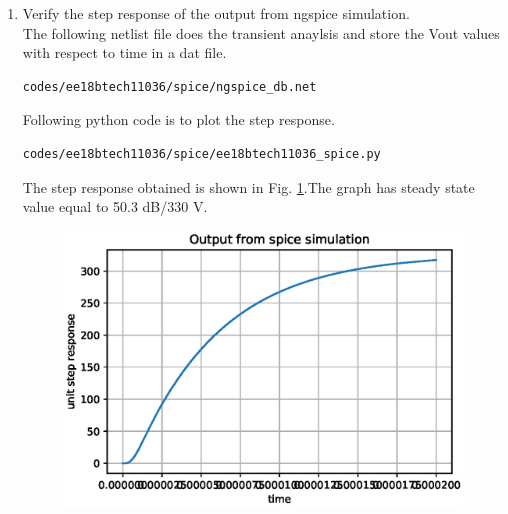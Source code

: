 \begin{enumerate}[label=\arabic*.,ref=\theenumi]
\item Verify the step response of the output from ngspice simulation.\\
\solution The following netlist file does the transient anaylsis and store the Vout values with respect to time in a dat file. 
\begin{lstlisting}
codes/ee18btech11036/spice/ngspice_db.net
\end{lstlisting}
Following python code is to plot the step response.
\begin{lstlisting}
codes/ee18btech11036/spice/ee18btech11036_spice.py
\end{lstlisting}
The step response obtained is shown in Fig. \ref{fig:ee18btech11036_ee18btech11036_5}.The graph has steady state value equal to 50.3 dB/330 V.
\begin{figure}[!ht]
\centering
\includegraphics[width=\columnwidth]{./figs/ee18btech11036/ee18btech11036_5.eps}
\caption{}
\label{fig:ee18btech11036_ee18btech11036_5}
\end{figure}

\end{enumerate}



